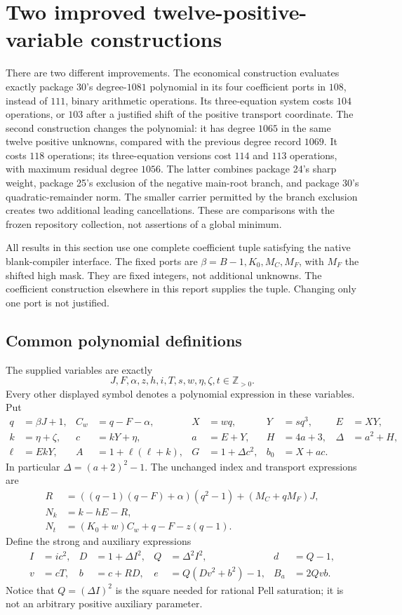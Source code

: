 \section{Two improved twelve-positive-variable constructions}
\label{sec:positive-improved}

There are two different improvements.  The economical construction evaluates
exactly package 30's degree-$1081$ polynomial in its four coefficient ports
in $108$, instead of $111$,
binary arithmetic operations.  Its three-equation system costs $104$
operations, or $103$ after a justified shift of the positive transport
coordinate.  The second construction changes the polynomial: it has degree
$1065$ in the same twelve positive unknowns, compared with the previous
degree record $1069$.  It costs $118$ operations; its three-equation versions
cost $114$ and $113$ operations, with maximum residual degree $1056$.
The latter combines package 24's sharp weight, package 25's exclusion of
the negative main-root branch, and package 30's quadratic-remainder norm.
The smaller carrier permitted by the branch exclusion creates two additional
leading cancellations.  These are comparisons with the frozen repository
collection, not assertions of a global minimum.

All results in this section use one complete coefficient tuple satisfying
the native blank-compiler interface.  The fixed ports are
$\beta=B-1,K_0,M_C,M_F$, with $M_F$ the shifted high mask.  They are fixed
integers, not additional unknowns.  The coefficient construction elsewhere
in this report supplies the tuple.  Changing only one port is not justified.

\subsection{Common polynomial definitions}

The supplied variables are exactly
\[
 J,F,\alpha,z,h,i,T,s,w,\eta,\zeta,t\in\mathbb Z_{>0}.
\]
Every other displayed symbol denotes a polynomial expression in these
variables.  Put
\begin{align*}
 q&=\beta J+1,& C_w&=q-F-\alpha,&X&=wq,&Y&=sq^3,&E&=XY,\\
 k&=\eta+\zeta,&c&=kY+\eta,&a&=E+Y,&H&=4a+3,&\Delta&=a^2+H,\\
 \ell&=EkY,&A&=1+\ell(\ell+k),&G&=1+\Delta c^2,&b_0&=X+ac.
\end{align*}
In particular $\Delta=(a+2)^2-1$.  The unchanged index and transport
expressions are
\begin{align*}
 R&=((q-1)(q-F)+\alpha)(q^2-1)+(M_C+qM_F)J,\\
 N_k&=k-hE-R,\\
 N_t&=(K_0+w)C_w+q-F-z(q-1).
\end{align*}
Define the strong and auxiliary expressions
\begin{align*}
 I&=ic^2,&D&=1+\Delta I^2,&Q&=\Delta^2 I^2,&d&=Q-1,\\
 v&=cT,&b&=c+RD,&e&=Q(Dv^2+b^2)-1,&B_a&=2Qvb.
\end{align*}
Notice that $Q=(\Delta I)^2$ is the square needed for rational Pell
saturation; it is not an arbitrary positive auxiliary parameter.


